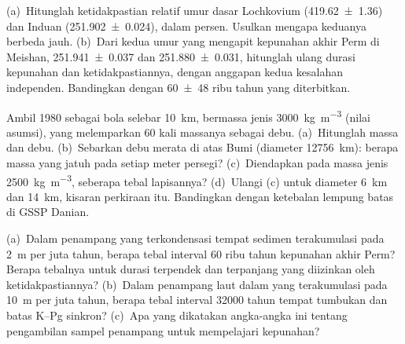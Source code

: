 \begin{exercise}[$\star\star$]\label{exo:b1:stratigraphic-scale:7}
(a)~Hitunglah ketidakpastian relatif umur dasar Lochkovium
(\qty[uncertainty-mode=separate]{419.62(136)}{\Ma}) dan Induan (\qty[uncertainty-mode=separate]{251.902(24)}{\Ma}), dalam persen. Usulkan mengapa keduanya berbeda jauh. (b)~Dari kedua umur yang mengapit kepunahan akhir Perm di Meishan,
\qty[uncertainty-mode=separate]{251.941(37)}{\Ma} dan
\qty[uncertainty-mode=separate]{251.880(31)}{\Ma}, hitunglah ulang durasi kepunahan dan ketidakpastiannya, dengan anggapan kedua kesalahan independen. Bandingkan dengan
\num[uncertainty-mode=separate]{60 \pm 48} ribu tahun yang diterbitkan.
\end{exercise}

\begin{exercise}[$\star\star$]\label{exo:b1:stratigraphic-scale:8}
Ambil  1980 sebagai bola selebar \qty{10}{km}, bermassa jenis \qty{3000}{kg.m^{-3}} (nilai asumsi), yang melemparkan 60 kali massanya sebagai debu. (a)~Hitunglah massa  dan debu. (b)~Sebarkan debu merata di atas Bumi (diameter \qty{12756}{km}): berapa massa yang jatuh pada setiap meter persegi? (c)~Diendapkan pada massa jenis \qty{2500}{kg.m^{-3}}, seberapa tebal lapisannya? (d)~Ulangi (c) untuk diameter \qty{6}{km} dan \qty{14}{km}, kisaran perkiraan itu. Bandingkan dengan ketebalan lempung batas di GSSP Danian.
\end{exercise}

\begin{exercise}[$\star\star$]\label{exo:b1:stratigraphic-scale:9}
(a)~Dalam penampang yang terkondensasi tempat sedimen terakumulasi pada \qty{2}{m} per juta tahun, berapa tebal interval \num{60} ribu tahun kepunahan akhir Perm? Berapa tebalnya untuk durasi terpendek dan terpanjang yang diizinkan oleh ketidakpastiannya? (b)~Dalam penampang laut dalam yang terakumulasi pada \qty{10}{m} per juta tahun, berapa tebal interval \num{32000} tahun tempat tumbukan dan batas K--Pg sinkron? (c)~Apa yang dikatakan angka-angka ini tentang pengambilan sampel penampang untuk mempelajari kepunahan?
\end{exercise}

